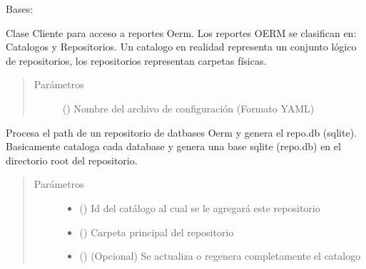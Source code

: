 \documentclass[a4paper,12pt,spanish]{sphinxmanual}
\begin{document}
\begin{fulllineitems}
\label{\detokenize{openerm.OermClient:openerm.OermClient.OermClient}}
Bases: 

Clase Cliente para acceso a reportes Oerm. Los reportes OERM
se clasifican en: Catalogos y Repositorios. Un catalogo en
realidad representa un conjunto lógico de repositorios, los
repositorios representan carpetas físicas.
\begin{quote}\begin{description}
\item[{Parámetros}] \leavevmode
{} () \textendash{} Nombre del archivo de configuración (Formato YAML)

\end{description}\end{quote}

\begin{fulllineitems}
\label{\detokenize{openerm.OermClient:openerm.OermClient.OermClient.add_repo}}
Procesa el path de un repositorio de datbases Oerm y genera el
repo.db (sqlite). Basicamente cataloga cada database y genera una
base sqlite (repo.db) en el directorio root del repositorio.
\begin{quote}\begin{description}
\item[{Parámetros}] \leavevmode\begin{itemize}
\item {} 
 () \textendash{} Id del catálogo al cual se le agregará este repositorio

\item {} 
 () \textendash{} Carpeta principal del repositorio

\item {} 
 () \textendash{} (Opcional) Se actualiza o regenera completamente el catalogo


\end{itemize}
\end{description}
\end{quote}
\end{fulllineitems}
\end{fulllineitems}
\end{document}
